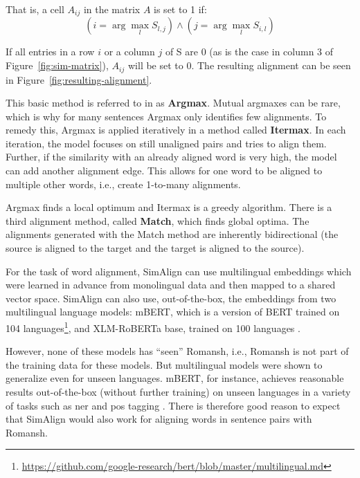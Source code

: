 That is, a cell $A_{ij}$ in the matrix $A$ is set to 1 if:
\[
	(i= \arg \max_l S_{l,j}) \land (j=\arg\max_l S_{i,l})
\]


If all entries in a row $i$ or a column $j$ of S are 0 (as is the case in column 3 of Figure~\ref{fig:sim-matrix}), $A_{ij}$ will be set to 0.
The resulting alignment can be seen in Figure~\ref{fig:resulting-alignment}.

This basic method is referred to in \cite{jalili-sabet-etal-2020-simalign} as \textbf{Argmax}. Mutual argmaxes can be rare, which is why for many sentences Argmax only identifies few alignments. 
To remedy this, Argmax is applied iteratively in a method called \textbf{Itermax}. 
In each iteration, the model focuses on still unaligned pairs and tries to align them. 
Further, if the similarity with an already aligned word is very high, the model can add another alignment edge. 
This allows for one word to be aligned to multiple other words, i.e., create 1-to-many alignments.

Argmax finds a local optimum and Itermax is a greedy algorithm. 
There is a third alignment method, called \textbf{Match}, which finds global optima. 
The alignments generated with the Match method are inherently bidirectional (the source is aligned to the target and the target is aligned to the source).

For the task of word alignment, SimAlign can use multilingual embeddings which were learned in advance from monolingual data and then mapped to a shared vector space. 
SimAlign can also use, out-of-the-box, the embeddings from two multilingual language models: mBERT, which is a version of BERT \autocite{delvin-chang-2018-bert} trained on 104 languages\footnote{\url{https://github.com/google-research/bert/blob/master/multilingual.md}}, and XLM-RoBERTa base, trained on 100 languages \autocite{conneau-etal-2020-xlm}. 

However, none of these models has \enquote{seen} Romansh, i.e., Romansh is not part of the training data for these models. 
But multilingual models were shown to generalize even for unseen languages. 
mBERT, for instance, achieves reasonable results out-of-the-box (without further training) on unseen languages in a variety of tasks such as \acrfull{ner} and \acrfull{pos} tagging \autocite{pires-etal-2019-multilingual}. 
There is therefore good reason to expect that SimAlign would also work for aligning words in sentence pairs with Romansh.


